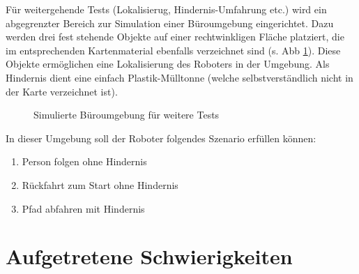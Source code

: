 Für weitergehende Tests (Lokalisierug, Hindernis-Umfahrung etc.) wird ein abgegrenzter Bereich zur Simulation einer Büroumgebung eingerichtet.
Dazu werden drei fest stehende Objekte auf einer rechtwinkligen Fläche platziert, die im entsprechenden Kartenmaterial ebenfalls verzeichnet sind (s. Abb \ref{fig:map_fzi}).
Diese Objekte ermöglichen eine Lokalisierung des Roboters in der Umgebung.
Als Hindernis dient eine einfach Plastik-Mülltonne (welche selbstverständlich nicht in der Karte verzeichnet ist).

\begin{figure}[h]
  \centering
  \quad %
  \caption{Simulierte Büroumgebung für weitere Tests}
  \label{fig:map_fzi}
\end{figure}

In dieser Umgebung soll der Roboter folgendes Szenario erfüllen können:
\begin{enumerate}
  \item Person folgen ohne Hindernis
  \item Rückfahrt zum Start ohne Hindernis
  \item Pfad abfahren mit Hindernis
\end{enumerate}



\section{Aufgetretene Schwierigkeiten}

